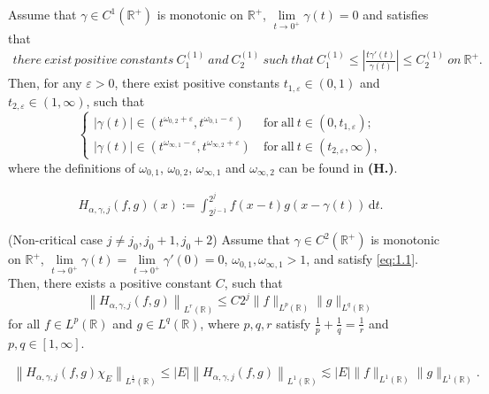 \documentclass[10pt,a4paper]{amsart}
\begin{document}
\begin{lemma}\label{lemma 2.1}
Assume that $\gamma\in C^{1}(\mathbb{R}^+)$ is monotonic on $\mathbb{R}^+$, $\lim\limits_{t\rightarrow 0^+}\gamma(t)=0$ and satisfies that
\begin{align}\label{eq:2.1}
there~ exist~ positive ~constants~ C^{(1)}_1~ and~ C^{(1)}_2 ~such~ that~ C^{(1)}_1\leq\left|\frac{t\gamma'(t)}{\gamma(t)}\right|\leq C^{(1)}_2~ on~ \mathbb{R}^+.
\end{align}
Then, for any $\varepsilon>0$, there exist positive constants $t_{1,\varepsilon}\in(0,1)$ and $t_{2,\varepsilon}\in(1,\infty)$, such that
$$\begin{cases}
  |\gamma(t)|\in(t^{\omega_{0,2}+\varepsilon},t^{\omega_{0,1}-\varepsilon})~ &\textrm{for}~ \textrm{all} ~t\in(0,t_{1,\varepsilon}); \\
  |\gamma(t)|\in(t^{\omega_{\infty,1}-\varepsilon},t^{\omega_{\infty,2}+\varepsilon})~ &\textrm{for}~ \textrm{all} ~t\in(t_{2,\varepsilon},\infty),
 \end{cases}$$
where the definitions of $\omega_{0,1}$, $\omega_{0,2}$, $\omega_{\infty,1}$ and $\omega_{\infty,2}$ can be found in {\bf(H.)}.
\end{lemma}

\begin{align}\label{eq:3.1}
H_{\alpha,\gamma,j}(f,g)(x):=\int_{2^{j-1}}^{2^j}f(x-t)g(x-\gamma(t))\,\textrm{d}t.
\end{align}

\begin{proposition}\label{proposition 3.1} (Non-critical case $j\neq j_0, j_0+1, j_0+2$) Assume that $\gamma\in C^2(\mathbb{R}^+)$ is monotonic on $\mathbb{R}^+$, $\lim\limits_{t\rightarrow 0^+}\gamma(t)=\lim\limits_{t\rightarrow 0^+}\gamma'(0)=0$, $\omega_{0,1}, \omega_{\infty,1}> 1$, and satisfy \eqref{eq:1.1}. Then, there exists a positive constant $C$, such that
$$\left\|H_{\alpha,\gamma,j}(f,g)\right\|_{L^{r}(\mathbb{R})}\leq C 2^j\|f\|_{L^{p}(\mathbb{R})}\|g\|_{L^{q}(\mathbb{R})}$$
 for all $f\in L^{p}(\mathbb{R})$ and $g\in L^{q}(\mathbb{R})$, where $p,q,r$ satisfy $\frac{1}{p}+\frac{1}{q}=\frac{1}{r}$ and $p, q \in [1, \infty]$.
\end{proposition}

\begin{align}\label{eq:3.4}
\left\|H_{\alpha,\gamma,j}(f,g)\chi_{E}\right\|_{L^{\frac{1}{2}}(\mathbb{R})}\leq |E|\left\|H_{\alpha,\gamma,j}(f,g)\right\|_{L^{1}(\mathbb{R})}\lesssim |E|\|f\|_{L^{1}(\mathbb{R})}\|g\|_{L^{1}(\mathbb{R})}.
\end{align}
\end{document}
